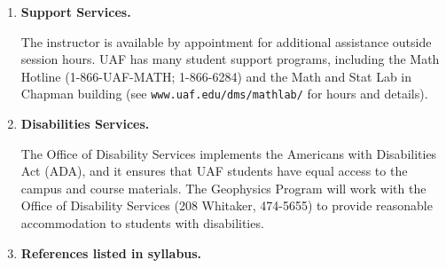 \documentclass[10pt,titlepage,fleqn]{article}
\begin{document}
\begin{enumerate}
\item {\bf Support Services.}

The instructor is available by appointment for additional assistance outside session hours. UAF has many student support programs, including the Math Hotline (1-866-UAF-MATH; 1-866-6284) and the Math and Stat Lab in Chapman building (see \verb+www.uaf.edu/dms/mathlab/+ for hours and details).

\item {\bf Disabilities Services.}

The Office of Disability Services implements the Americans with Disabilities Act (ADA), and it ensures that UAF students have equal access to the campus and course materials. The Geophysics Program will work with the Office of Disability Services (208 Whitaker, 474-5655) to provide reasonable accommodation to students with disabilities.


\item {\bf References listed in syllabus.}

\renewcommand{\refname}{}

\vspace{-1.4cm}

\begin{spacing}{1.0}
%


\end{spacing}

\end{enumerate}

\end{document}
